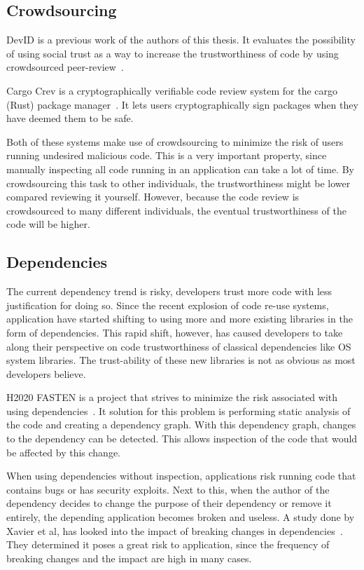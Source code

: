 \subsection{Crowdsourcing}
DevID is a previous work of the authors of this thesis. It evaluates the possibility of using social trust as a way to increase the trustworthiness of code by using crowdsourced peer-review~\cite{de2019devid}.

Cargo Crev is a cryptographically verifiable code review system for the cargo (Rust) package manager~\cite{cargocrev}. It lets users cryptographically sign packages when they have deemed them to be safe.

Both of these systems make use of crowdsourcing to minimize the risk of users running undesired malicious code. This is a very important property, since manually inspecting all code running in an application can take a lot of time. By crowdsourcing this task to other individuals, the trustworthiness might be lower compared reviewing it yourself. However, because the code review is crowdsourced to many different individuals, the eventual trustworthiness of the code will be higher.  

\subsection{Dependencies}
The current dependency trend is risky, developers trust more code with less justification for doing so. Since the recent explosion of code re-use systems, application have started shifting to using more and more existing libraries in the form of dependencies. This rapid shift, however, has caused developers to take along their perspective on code trustworthiness of classical dependencies like OS system libraries. The trust-ability of these new libraries is not as obvious as most developers believe.

H2020 FASTEN is a project that strives to minimize the risk associated with using dependencies~\cite{fasten}. It solution for this problem is performing static analysis of the code and creating a dependency graph. With this dependency graph, changes to the dependency can be detected. This allows inspection of the code that would be affected by this change.

When using dependencies without inspection, applications risk running code that contains bugs or has security exploits. Next to this, when the author of the dependency decides to change the purpose of their dependency or remove it entirely, the depending application becomes broken and useless. A study done by Xavier et al, has looked into the impact of breaking changes in dependencies~\cite{xavier2017historical}. They determined it poses a great risk to application, since the frequency of breaking changes and the impact are high in many cases.

